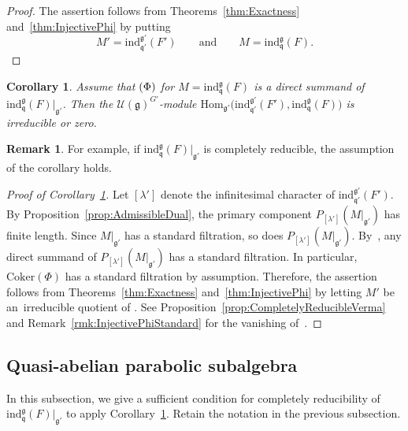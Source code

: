\documentclass[pdftex]{sigma}
\numberwithin{equation}{section}
\newtheorem{Corollary}[Theorem]{Corollary}
\theoremstyle{definition}
\newtheorem{Remark}[Theorem]{Remark}
\newcommand{\Coker}{\mathrm{Coker}}
\newcommand{\Hom}{\mathrm{Hom}}
\newcommand{\lieC}[1]{\mathfrak{#1}}
\newcommand{\lie}[1]{\mathfrak{#1}}
\newcommand{\univ}[1]{\mathcal{U}(\lieC{#1})}
\newcommand{\ind}[2]{\mathrm{ind}^{\lieC{#1}}_{\lieC{#2}}}
\newcommand{\zuck}[2]{\Gamma^{#1}_{#2}}
\newcommand{\Dzuck}[3]{R^{#3}\zuck{#1}{#2}}
\let\Im\relax
\DeclareMathOperator{\Im}{\mathrm{Im}}
\newcommand{\fdual}[1]{{#1}^{d}}
\begin{document}
\begin{proof}
	The assertion follows from Theorems~\ref{thm:Exactness} and~\ref{thm:InjectivePhi} by putting
\[
M' = \ind{g'}{q'}(F')\qquad \text{and}\qquad {M = \ind{g}{q}(F)}.
\tag*{\qed}
\]
\renewcommand{\qed}{}
\end{proof}

\begin{Corollary}\label{cor:GeneralizedVermaIrreducible}
	Assume that $\Im(\Phi)$ for $M = \ind{g}{q}(F)$ is a direct summand of $\ind{g}{q}(F)|_{\lie{g'}}$.
	Then the $\univ{g}^{G'}$-module $\Hom_{\lie{g'}}\bigl(\ind{g'}{q'}(F'), \ind{g}{q}(F)\bigr)$ is irreducible or zero.
\end{Corollary}

\begin{Remark}
	For example, if $\ind{g}{q}(F)|_{\lie{g'}}$ is completely reducible, the assumption of the corollary holds.
\end{Remark}

\begin{proof}[Proof of Corollary~\ref{cor:GeneralizedVermaIrreducible}]
	Let $[\lambda']$ denote the infinitesimal character of $\ind{g'}{q'}(F')$.
	By Proposition~\ref{prop:AdmissibleDual}, the primary component $P_{[\lambda']}(M|_{\lie{g'}})$ has finite length.
	Since $M|_{\lie{g'}}$ has a standard filtration, so does $P_{[\lambda']}(M|_{\lie{g'}})$.
	By~\cite[Proposition~3.7 and Theorem~9.8\,(3)]{Hu08_category_o}, any direct summand of $P_{[\lambda']}(M|_{\lie{g'}})$ has a standard filtration.
	In particular, $\Coker(\Phi)$ has a standard filtration by assumption.
	Therefore, the assertion follows from Theorems~\ref{thm:Exactness} and~\ref{thm:InjectivePhi} by letting $M'$ be an~irreducible quotient of \smash{$\ind{g'}{q'}\bigl(\fdual{F'}\bigr)$}.
	See Proposition~\ref{prop:CompletelyReducibleVerma} and Remark~\ref{rmk:InjectivePhiStandard} for the vanishing of~\smash{$\Dzuck{\Delta(G')}{\Delta(L')}{S - 1}(M'\otimes \Coker(\Phi))^{\Delta(G')}$}.
\end{proof}

\subsection{Quasi-abelian parabolic subalgebra}

In this subsection, we give a sufficient condition for completely reducibility of $\ind{g}{q}(F)|_{\lie{g'}}$
to apply Corollary~\ref{cor:GeneralizedVermaIrreducible}.
Retain the notation in the previous subsection.
\end{document}
